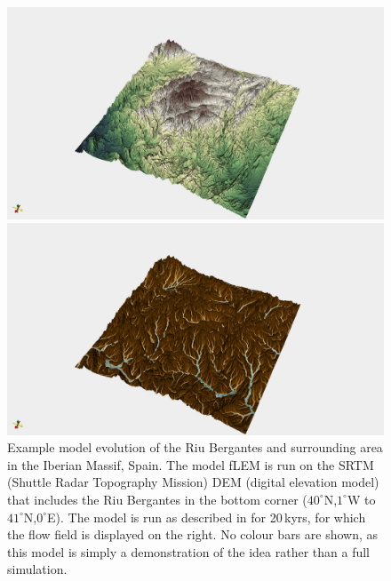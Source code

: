 \begin{figure}
\begin{minipage}{\textwidth}
\begin{minipage}{.5\textwidth}
\includegraphics[width=.98\textwidth]{./figures/ch3-bergantes-elevation.png}
\end{minipage}
\begin{minipage}{.5\textwidth}
\includegraphics[width=.98\textwidth]{./figures/ch3-bergantes-flow.png}
\end{minipage}
\end{minipage}
\caption{Example model evolution of the Riu Bergantes and surrounding area in the Iberian Massif, Spain. The model fLEM is run on the SRTM (Shuttle Radar Topography Mission) DEM (digital elevation model) that includes the Riu Bergantes in the bottom corner ($40^{\circ}$N,$1^{\circ}$W to $41^{\circ}$N,$0^{\circ}$E). The model is run as described in \cite{armitage-2019} for 20\,kyrs, for which the flow field is displayed on the right. No colour bars are shown, as this model is simply a demonstration of the idea rather than a full simulation.}
\label{fg:bergantes}
\end{figure}

